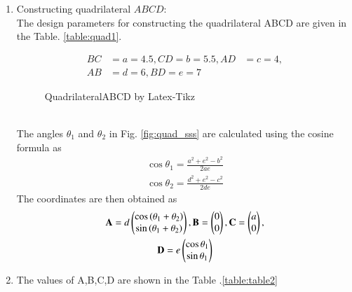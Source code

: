 \renewcommand{\theequation}{\theenumi}
\begin{enumerate}[label=\arabic*.,ref=\thesubsection.\theenumi]

\item Constructing quadrilateral $ABCD$:
\label{const:table1}
\\
\solution  The design parameters for constructing the quadrilateral ABCD are given in the Table. \ref{table:quad1}. 
%
\begin{table}[ht!]
\centering

\caption{Parameters  for Quadrilateral ABCD}
\label{table:quad1}	
\end{table}

\begin{align}
BC &= a = 4.5,  
CD = b = 5.5, 
AD &=c = 4,
\\  
AB &= d = 6,
BD = e = 7 
\end{align}
%
\begin{figure}[!ht]
	\begin{center}
			\resizebox{\columnwidth}{!}{}
	\end{center}
	\caption{QuadrilateralABCD by Latex-Tikz}
	\label{fig:quad1}	
\end{figure}
%
\\
\solution The angles $\theta_1$ and $\theta_2$ in Fig. 	\ref{fig:quad_sss}	
are calculated using the cosine formula as
\begin{align}
\label{eq:tri_rot_ang}
\cos \theta_1 = \frac{a^2+e^2-b^2}{2ae}
\\
\cos \theta_2 = \frac{d^2+e^2-c^2}{2de}
\end{align}
%
The coordinates are then obtained as
\begin{multline}
\label{eq:tri_basic_new}
\mathbf{A} = d\begin{pmatrix}\cos \left(\theta_1+\theta_2\right)\\ \sin \left(\theta_1+\theta_2\right)\end{pmatrix}, \mathbf{B} = \begin{pmatrix}0\\0\end{pmatrix}, \mathbf{C} = \begin{pmatrix}a\\0\end{pmatrix}, 
\\
\mathbf{D} = e\begin{pmatrix}\cos \theta_1\\ \sin \theta_1\end{pmatrix}
\end{multline}
%
\item The values of A,B,C,D are shown in the Table .\ref{table:table2}


\end{enumerate}
